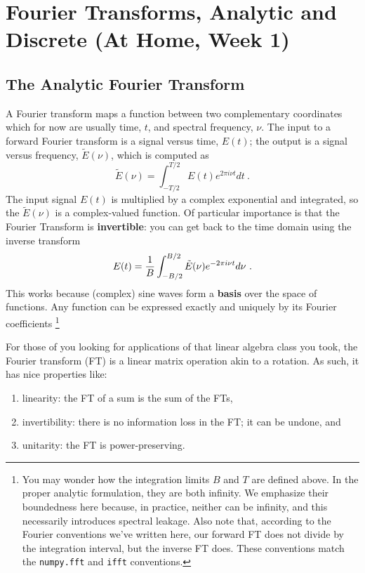 \documentclass[12pt,preprint]{aastex}
\begin{document}
\section{Fourier Transforms, Analytic and Discrete (At Home, Week 1)} 
\label{pwrspectrum}
 
\subsection{The Analytic Fourier Transform}

\noindent
A Fourier transform maps a function between two complementary coordinates which
for now are usually time, $t$, and spectral frequency, $\nu$.
The input to a forward Fourier transform is a signal versus time, 
$E(t)$; the output is a signal versus frequency, $\tilde E(\nu)$,
which is computed as
% 
\begin{equation}
\tilde E(\nu) = \int_{-T/2}^{T/2} E(t) e^{2 \pi i \nu t} dt \ .
\label{eq:dft}
\end{equation}
% 
\noindent The input signal $E(t)$ is multiplied by a complex
exponential and integrated, so the $\tilde E(\nu)$ is a complex-valued function. Of particular
importance is that the Fourier Transform is {\bf invertible}: 
you can get back to the time domain using the inverse transform
%
\begin{equation}
E(t) = {1 \over B} \int_{-B/2}^{B/2} \tilde E(\nu) e^{-2 \pi i \nu t} d\nu \ .
\end{equation}
% 
This works because (complex) sine waves form a {\bf basis} over the space of functions.
Any function can be expressed exactly and uniquely by its Fourier coefficients
\footnote{You may wonder how
the integration limits $B$ and $T$ are defined above. In the proper
analytic formulation, they are both infinity. We emphasize their
boundedness here because, in practice, 
neither can be infinity, and this necessarily introduces spectral leakage. Also note that,
according to the Fourier conventions we've written here, our forward FT does not divide
by the integration interval, but the inverse FT does.  These conventions match 
the {\tt numpy.fft}
and {\tt ifft} conventions.}

For those of you looking for applications of that linear algebra class you took,
the Fourier transform (FT) is a linear matrix operation akin to a rotation. 
As such, it has nice properties like:
\begin{enumerate}
\item linearity: the FT
of a sum is the sum of the FTs, 
\item invertibility: there is no information loss in the FT; it can be undone, and 
\item unitarity: the FT is power-preserving.
\end{enumerate}
\end{document}
